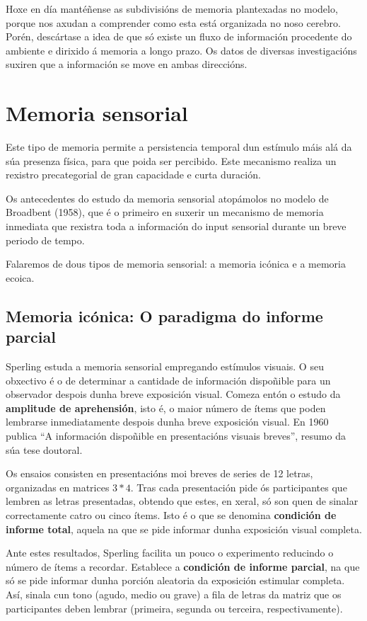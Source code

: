 \documentclass[a4paper,11pt]{article}
\begin{document}
Hoxe en día mantéñense as subdivisións de memoria plantexadas no modelo, porque nos axudan a comprender como esta está organizada no noso cerebro. Porén, descártase a idea de que só existe un fluxo de información procedente do ambiente e dirixido á memoria a longo prazo. Os datos de diversas investigacións suxiren que a información se move en ambas direccións. 

\section{Memoria sensorial}
Este tipo de memoria permite a persistencia temporal dun estímulo máis alá da súa presenza física, para que poida ser percibido. Este mecanismo realiza un rexistro precategorial de gran capacidade e curta duración.

Os antecedentes do estudo da memoria sensorial atopámolos no modelo de Broadbent (1958), que é o primeiro en suxerir un mecanismo de memoria inmediata que rexistra toda a información do input sensorial durante un breve periodo de tempo.

Falaremos de dous tipos de memoria sensorial: a memoria icónica e a memoria ecoica.

\subsection{Memoria icónica: O paradigma do informe parcial}
Sperling estuda a memoria sensorial empregando estímulos visuais. O seu obxectivo é o de determinar a cantidade de información dispoñible para un observador despois dunha breve exposición visual. Comeza entón o estudo da \textbf{amplitude de aprehensión}, isto é, o maior número de ítems que poden lembrarse inmediatamente despois dunha breve exposición visual. En 1960 publica ``A información dispoñible en presentacións visuais breves'', resumo da súa tese doutoral.

Os ensaios consisten en presentacións moi breves de series de 12 letras, organizadas en matrices $3*4$. Tras cada presentación pide ós participantes que lembren as letras presentadas, obtendo que estes, en xeral, só son quen de sinalar correctamente catro ou cinco ítems. Isto é o que se denomina \textbf{condición de informe total}, aquela na que se pide informar dunha exposición visual completa.

Ante estes resultados, Sperling facilita un pouco o experimento reducindo o número de ítems a recordar. Establece a \textbf{condición de informe parcial}, na que só se pide informar dunha porción aleatoria da exposición estimular completa. Así, sinala cun tono (agudo, medio ou grave) a fila de letras da matriz que os participantes deben lembrar (primeira, segunda ou terceira, respectivamente).  
\end{document}

